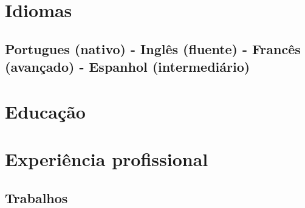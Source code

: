 \documentclass[11pt,a4paper,]{awesome-cv}
\begin{document}
\hypertarget{idiomas}{%
\section{Idiomas}\label{idiomas}}

\hypertarget{portugues-nativo---ingluxeas-fluente---francuxeas-avanuxe7ado---espanhol-intermediuxe1rio}{%
\subsection{Portugues (nativo) - Inglês (fluente) - Francês (avançado) -
Espanhol
(intermediário)}\label{portugues-nativo---ingluxeas-fluente---francuxeas-avanuxe7ado---espanhol-intermediuxe1rio}}

\hypertarget{educauxe7uxe3o}{%
\section{Educação}\label{educauxe7uxe3o}}

\begin{cventries}
    \vspace{-4.0mm}
    \vspace{-4.0mm}
    \vspace{-4.0mm}
\end{cventries}

\hypertarget{experiuxeancia-profissional}{%
\section{Experiência profissional}\label{experiuxeancia-profissional}}

\hypertarget{trabalhos}{%
\subsection{Trabalhos}\label{trabalhos}}
\end{document}
